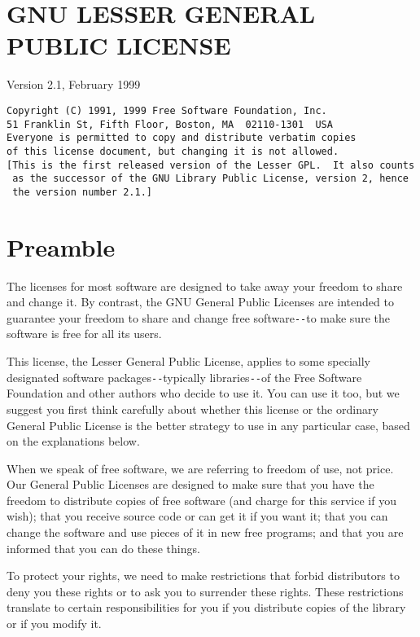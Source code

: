 \section{GNU LESSER GENERAL PUBLIC LICENSE}
\label{SEC12}

Version 2.1, February 1999 

\footnotesize
\begin{verbatim}
Copyright (C) 1991, 1999 Free Software Foundation, Inc.
51 Franklin St, Fifth Floor, Boston, MA  02110-1301  USA
Everyone is permitted to copy and distribute verbatim copies
of this license document, but changing it is not allowed.
[This is the first released version of the Lesser GPL.  It also counts
 as the successor of the GNU Library Public License, version 2, hence
 the version number 2.1.]
\end{verbatim}
\normalsize

\section{Preamble}
\label{SEC23}

The licenses for most software are designed to take away your freedom to share
and change it. By contrast, the GNU General Public Licenses are intended to
guarantee your freedom to share and change free software\verb:--:to make sure the
software is free for all its users. 

This license, the Lesser General Public License, applies to some specially
designated software packages\verb:--:typically libraries\verb:--:of the Free Software
Foundation and other authors who decide to use it. You can use it too, but we
suggest you first think carefully about whether this license or the ordinary
General Public License is the better strategy to use in any particular case,
based on the explanations below. 

When we speak of free software, we are referring to freedom of use, not price.
Our General Public Licenses are designed to make sure that you have the
freedom to distribute copies of free software (and charge for this service if
you wish); that you receive source code or can get it if you want it; that you
can change the software and use pieces of it in new free programs; and that
you are informed that you can do these things. 

To protect your rights, we need to make restrictions that forbid distributors
to deny you these rights or to ask you to surrender these rights. These
restrictions translate to certain responsibilities for you if you distribute
copies of the library or if you modify it. 

